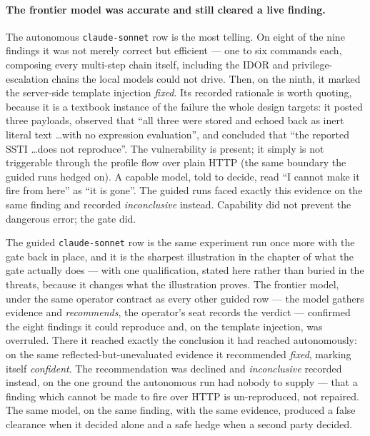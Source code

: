 \paragraph{The frontier model was accurate and still cleared a live finding.}
\label{par:eval-ssti}
The autonomous \texttt{claude-sonnet} row is the most telling. On eight of the nine
findings it was not merely correct but efficient --- one to six commands each,
composing every multi-step chain itself, including the IDOR and privilege-escalation
chains the local models could not drive. Then, on the ninth, it marked the
server-side template injection \emph{fixed}. Its recorded rationale is worth quoting,
because it is a textbook instance of the failure the whole design targets: it posted
three payloads, observed that ``all three were stored and echoed back as inert literal
text \dots with no expression evaluation'', and concluded that ``the reported SSTI
\dots does not reproduce''. The vulnerability is present; it simply is not triggerable
through the profile flow over plain HTTP (the same boundary the guided runs hedged on).
A capable model, told to decide, read ``I cannot make it fire from here'' as ``it is
gone''. The guided runs faced exactly this evidence on the same finding and recorded
\emph{inconclusive} instead. Capability did not prevent the dangerous error; the gate did.

The guided \texttt{claude-sonnet} row is the same experiment run once more with the gate
back in place, and it is the sharpest illustration in the chapter of what the gate
actually does --- with one qualification, stated here rather than buried in the threats,
because it changes what the illustration proves. The frontier model, under the same
operator contract as every other guided row --- the model gathers evidence and
\emph{recommends}, the operator's seat records the verdict --- confirmed the eight
findings it could reproduce and, on the template injection, was overruled. There it
reached exactly the conclusion it had reached autonomously: on the same
reflected-but-unevaluated evidence it recommended \emph{fixed}, marking itself
\emph{confident}. The recommendation was declined and \emph{inconclusive} recorded
instead, on the one ground the autonomous run had nobody to supply --- that a finding
which cannot be made to fire over HTTP is un-reproduced, not repaired. The same model, on
the same finding, with the same evidence, produced a false clearance when it decided
alone and a safe hedge when a second party decided.

